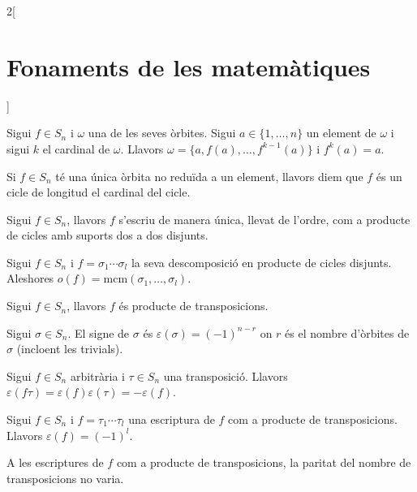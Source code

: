 \documentclass[class=article,10pt,crop=false]{standalone}
\begin{document}
\begin{multicols}{2}[\section{Fonaments de les matemàtiques}]
\begin{theorem}
Sigui $f\in S_n$ i $\omega$ una de les seves òrbites. Sigui $a\in\{1,\ldots,n\}$ un element de $\omega$ i sigui $k$ el cardinal de $\omega$. Llavors $\omega=\{a,f(a),\ldots,f^{k-1}(a)\}$ i $f^k(a)=a$.
\end{theorem}
\begin{definition}
Si $f\in S_n$ té una única òrbita no reduïda a un element, llavors diem que $f$ és un cicle de longitud el cardinal del cicle. 
\end{definition}
\begin{theorem}
Sigui $f\in S_n$, llavors $f$ s'escriu de manera única, llevat de l'ordre, com a producte de cicles amb suports dos a dos disjunts.
\end{theorem}
\begin{corollary}
Sigui $f\in S_n$ i $f=\sigma_1\cdots\sigma_l$ la seva descomposició en producte de cicles disjunts. Aleshores $o(f)=\text{mcm}(\sigma_1,\ldots,\sigma_l)$.
\end{corollary}
\begin{corollary}
Sigui $f\in S_n$, llavors $f$ és producte de transposicions.
\end{corollary}
\begin{definition}
Sigui $\sigma\in S_n$. El signe de $\sigma$ és $\varepsilon(\sigma)=(-1)^{n-r}$ on $r$ és el nombre d'òrbites de $\sigma$ (incloent les trivials).
\end{definition}
\begin{theorem}
Sigui $f\in S_n$ arbitrària i $\tau\in S_n$ una transposició. Llavors $\varepsilon(f\tau)=\varepsilon(f)\varepsilon(\tau)=-\varepsilon(f)$.
\end{theorem}
\begin{corollary}
Sigui $f\in S_n$ i $f=\tau_1\cdots\tau_l$ una escriptura de $f$ com a producte de transposicions. Llavors $\varepsilon(f)=(-1)^l$.
\end{corollary}
\begin{corollary}
A les escriptures de $f$ com a producte de transposicions, la paritat del nombre de transposicions no varia.
\end{corollary}

\end{multicols}
\end{document}
